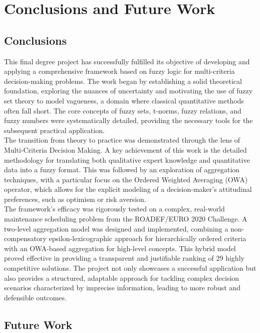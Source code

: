 \chapter*{Conclusions and Future Work}

\section*{Conclusions}

This final degree project has successfully fulfilled its objective of developing and applying a comprehensive framework based on fuzzy logic for multi-criteria decision-making problems. The work began by establishing a solid theoretical foundation, exploring the nuances of uncertainty and motivating the use of fuzzy set theory to model vagueness, a domain where classical quantitative methods often fall short. The core concepts of fuzzy sets, t-norms, fuzzy relations, and fuzzy numbers were systematically detailed, providing the necessary tools for the subsequent practical application.\\

The transition from theory to practice was demonstrated through the lens of Multi-Criteria Decision Making. A key achievement of this work is the detailed methodology for translating both qualitative expert knowledge and quantitative data into a fuzzy format. This was followed by an exploration of aggregation techniques, with a particular focus on the Ordered Weighted Averaging (OWA) operator, which allows for the explicit modeling of a decision-maker's attitudinal preferences, such as optimism or risk aversion.\\

The framework's efficacy was rigorously tested on a complex, real-world maintenance scheduling problem from the ROADEF/EURO 2020 Challenge. A two-level aggregation model was designed and implemented, combining a non-compensatory epsilon-lexicographic approach for hierarchically ordered criteria with an OWA-based aggregation for high-level concepts. This hybrid model proved effective in providing a transparent and justifiable ranking of 29 highly competitive solutions. The project not only showcases a successful application but also provides a structured, adaptable approach for tackling complex decision scenarios characterized by imprecise information, leading to more robust and defensible outcomes.

\section*{Future Work}

